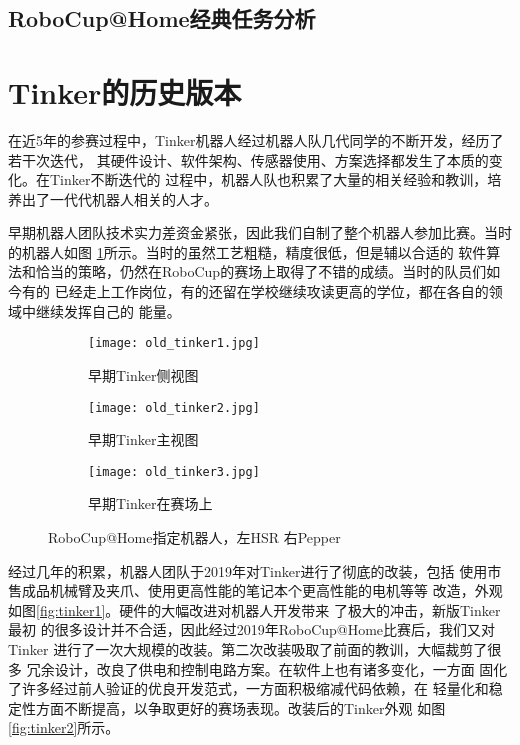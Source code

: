 \subsection{RoboCup@Home经典任务分析}




\section{Tinker的历史版本}

在近5年的参赛过程中，Tinker机器人经过机器人队几代同学的不断开发，经历了若干次迭代，
其硬件设计、软件架构、传感器使用、方案选择都发生了本质的变化。在Tinker不断迭代的
过程中，机器人队也积累了大量的相关经验和教训，培养出了一代代机器人相关的人才。

早期机器人团队技术实力差资金紧张，因此我们自制了整个机器人参加比赛。当时的机器人如图
\ref{fig:old_tinker}所示。当时的虽然工艺粗糙，精度很低，但是辅以合适的
软件算法和恰当的策略，仍然在RoboCup的赛场上取得了不错的成绩。当时的队员们如今有的
已经走上工作岗位，有的还留在学校继续攻读更高的学位，都在各自的领域中继续发挥自己的
能量。


\begin{figure}[H]
\centering
\begin{subfigure}{.5\textwidth}
  \centering
  \texttt{[image: old\_tinker1.jpg]}
  \caption{早期Tinker侧视图}
\end{subfigure}%
\begin{subfigure}{.5\textwidth}
  \centering
  \texttt{[image: old\_tinker2.jpg]}
  \caption{早期Tinker主视图}
\end{subfigure}
\begin{subfigure}{.8\textwidth}
  \centering
  \texttt{[image: old\_tinker3.jpg]}
  \caption{早期Tinker在赛场上}
\end{subfigure}
\caption{RoboCup@Home指定机器人，左HSR 右Pepper}
\label{fig:old_tinker}
\end{figure}

经过几年的积累，机器人团队于2019年对Tinker进行了彻底的改装，包括
使用市售成品机械臂及夹爪、使用更高性能的笔记本个更高性能的电机等等
改造，外观如图\ref{fig:tinker1}。硬件的大幅改进对机器人开发带来
了极大的冲击，新版Tinker最初
的很多设计并不合适，因此经过2019年RoboCup@Home比赛后，我们又对Tinker
进行了一次大规模的改装。第二次改装吸取了前面的教训，大幅裁剪了很多
冗余设计，改良了供电和控制电路方案。在软件上也有诸多变化，一方面
固化了许多经过前人验证的优良开发范式，一方面积极缩减代码依赖，在
轻量化和稳定性方面不断提高，以争取更好的赛场表现。改装后的Tinker外观
如图\ref{fig:tinker2}所示。

